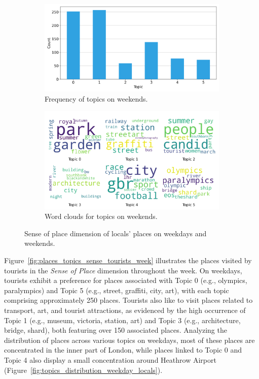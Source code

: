 \documentclass{article}
\theoremstyle{definition}
\theoremstyle{remark}
\begin{document}
\begin{figure}[!h]
    \begin{subfigure}{0.45\textwidth}
        \centering
        \includegraphics[width=\linewidth]{figures/places_sense_weekend_locals.png}
        \caption{Frequency of topics on weekends.}
        \label{fig:places_sense_weekdend_locals}
    \end{subfigure}
    \hfill
    \begin{subfigure}{0.5\textwidth}
        \centering
        \includegraphics[width=\linewidth]{figures/topics_weekend_locals.png}
        \caption{Word clouds for topics on weekends.}
        \label{fig:topics_weekend_locals}
    \end{subfigure}

    \caption{Sense of place dimension of locals' places on weekdays and weekends.}
    \label{fig:places_topics_sense_locals_week}
\end{figure}

Figure~\ref{fig:places_topics_sense_tourists_week} illustrates the places visited by tourists in the \textit{Sense of Place} dimension throughout the week. On weekdays, tourists exhibit a preference for places associated with Topic 0 (e.g., olympics, paralympics) and Topic 5 (e.g., street, graffiti, city, art), with each topic comprising approximately 250 places. Tourists also like to visit places related to transport, art, and tourist attractions, as evidenced by the high occurrence of Topic 1 (e.g., museum, victoria, station, art) and Topic 3 (e.g., architecture, bridge, shard), both featuring over 150 associated places. Analyzing the distribution of places across various topics on weekdays, most of these places are concentrated in the inner part of London, while places linked to Topic 0 and Topic 4 also display a small concentration around Heathrow Airport (Figure~\ref{fig:topics_distribution_weekday_locals}).
\end{document}
